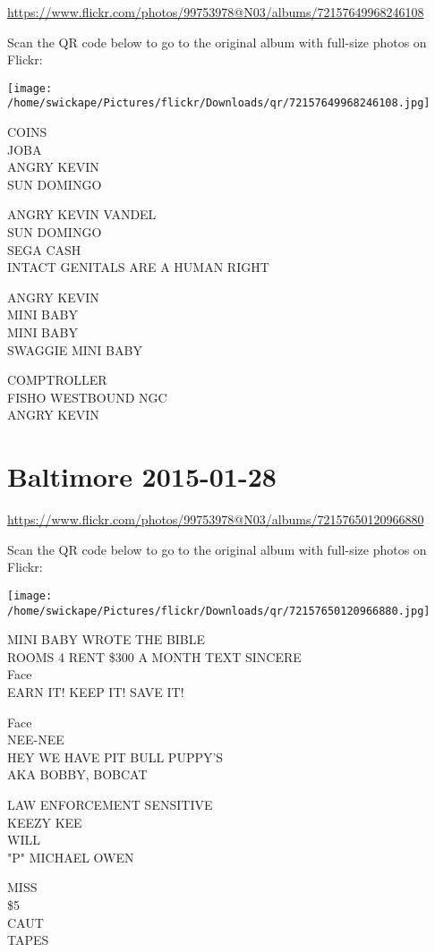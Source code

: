 \documentclass[10pt,letterpaper]{article}
\begin{document}
\url{https://www.flickr.com/photos/99753978@N03/albums/72157649968246108}

Scan the QR code below to go to the original album with full-size photos on Flickr:

\texttt{[image: /home/swickape/Pictures/flickr/Downloads/qr/72157649968246108.jpg]}
\pagebreak

COINS\\
JOBA\\
ANGRY KEVIN\\
SUN DOMINGO

ANGRY KEVIN VANDEL\\
SUN DOMINGO\\
SEGA CASH\\
INTACT GENITALS ARE A HUMAN RIGHT

ANGRY KEVIN\\
MINI BABY\\
MINI BABY\\
SWAGGIE MINI BABY

COMPTROLLER\\
FISHO WESTBOUND NGC\\
ANGRY KEVIN
\pagebreak

\section*{Baltimore 2015-01-28}

\url{https://www.flickr.com/photos/99753978@N03/albums/72157650120966880}

Scan the QR code below to go to the original album with full-size photos on Flickr:

\texttt{[image: /home/swickape/Pictures/flickr/Downloads/qr/72157650120966880.jpg]}
\pagebreak

MINI BABY WROTE THE BIBLE\\
ROOMS 4 RENT \$300 A MONTH TEXT SINCERE\\
Face\\
EARN IT!  KEEP IT!  SAVE IT!

Face\\
NEE{-}NEE\\
HEY WE HAVE PIT BULL PUPPY'S\\
AKA BOBBY, BOBCAT

LAW ENFORCEMENT SENSITIVE\\
KEEZY KEE\\
WILL\\
"P" MICHAEL OWEN

MISS\\
\$5\\
CAUT\\
TAPES
\end{document}
